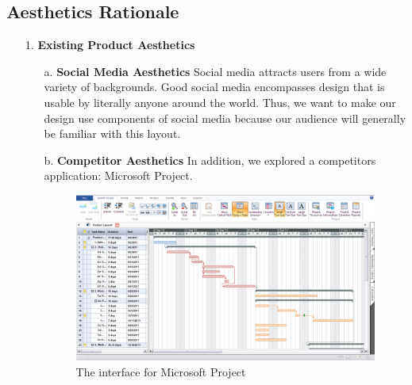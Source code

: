 \begin{enumerate}
\subsection{Aesthetics Rationale}
\begin{enumerate}
\item[1.] \textbf{Existing Product Aesthetics}
\begin{enumerate}
\item[a.] \textbf{Social Media Aesthetics} Social media attracts users from a wide variety of backgrounds. Good social media encompasses design that is usable by literally anyone around the world. Thus, we want to make our design use components of social media because our audience will generally be familiar with this layout. 
\item[b.] \textbf{Competitor Aesthetics} In addition, we explored a competitor\textsc{}s application: Microsoft Project.
\FloatBarrier
\begin{figure}[ht]
\includegraphics[width=\textwidth]{msoftp.png}
\caption{The interface for Microsoft Project}
\end{figure}
\FloatBarrier
 

\end{enumerate}
\end{enumerate}
\end{enumerate}

